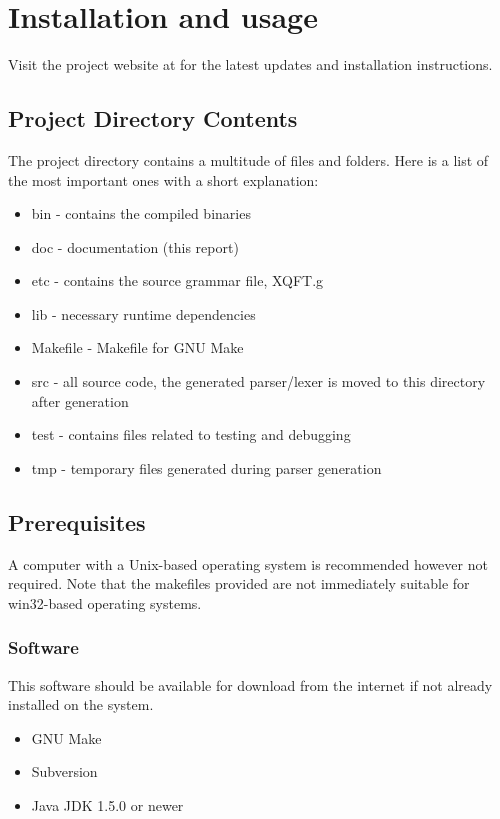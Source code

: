 \chapter{Installation and usage}
\label{appendix:installation}
Visit the project website at
for the latest updates and installation instructions.

\section*{Project Directory Contents}
The project directory contains a multitude of files and folders. Here is a list
of the most important ones with a short explanation:
\begin{itemize}
  \item bin - contains the compiled binaries
  \item doc - documentation (this report)
  \item etc - contains the source grammar file, XQFT.g
  \item lib - necessary runtime dependencies
  \item Makefile - Makefile for GNU Make
  \item src - all source code, the generated parser/lexer is moved to this
  directory after generation
  \item test - contains files related to testing and debugging
  \item tmp - temporary files generated during parser generation
\end{itemize}

\section*{Prerequisites}
A computer with a Unix-based operating system is recommended however not
required. Note that the makefiles provided are not immediately suitable for
win32-based operating systems.

\subsection*{Software}
This software should be available for download from the internet if not already
installed on the system.

\begin{itemize}
  \item GNU Make
  \item Subversion
  \item Java JDK 1.5.0 or newer
\end{itemize}

